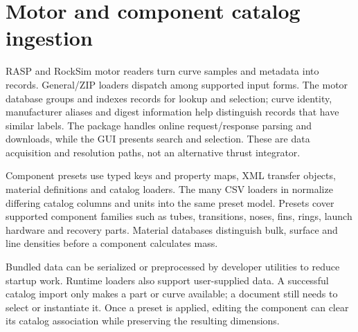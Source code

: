 
\section{Motor and component catalog ingestion}
RASP  and RockSim  motor readers turn curve samples and metadata into  records. General/ZIP loaders dispatch among supported input forms. The motor database groups and indexes records for lookup and selection; curve identity, manufacturer aliases and digest information help distinguish records that have similar labels. The  package handles online request/response parsing and downloads, while the GUI presents search and selection. These are data acquisition and resolution paths, not an alternative thrust integrator.

Component presets use typed keys and property maps, XML transfer objects, material definitions and catalog loaders. The many CSV loaders in  normalize differing catalog columns and units into the same preset model. Presets cover supported component families such as tubes, transitions, noses, fins, rings, launch hardware and recovery parts. Material databases distinguish bulk, surface and line densities before a component calculates mass.

Bundled data can be serialized or preprocessed by developer utilities to reduce startup work. Runtime loaders also support user-supplied data. A successful catalog import only makes a part or curve available; a document still needs to select or instantiate it. Once a preset is applied, editing the component can clear its catalog association while preserving the resulting dimensions.

